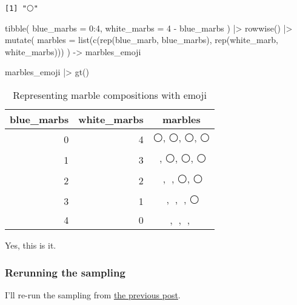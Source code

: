 \documentclass[
  letterpaper,
  DIV=11,
  numbers=noendperiod]{scrartcl}
\newenvironment{Shaded}{\begin{snugshade}}{\end{snugshade}}
\newcommand{\AttributeTok}[1]{\textcolor[rgb]{0.40,0.45,0.13}{#1}}
\newcommand{\DecValTok}[1]{\textcolor[rgb]{0.68,0.00,0.00}{#1}}
\newcommand{\FunctionTok}[1]{\textcolor[rgb]{0.28,0.35,0.67}{#1}}
\newcommand{\NormalTok}[1]{\textcolor[rgb]{0.00,0.23,0.31}{#1}}
\newcommand{\OtherTok}[1]{\textcolor[rgb]{0.00,0.23,0.31}{#1}}
\newcommand{\SpecialCharTok}[1]{\textcolor[rgb]{0.37,0.37,0.37}{#1}}
\begin{document}
\begin{verbatim}
[1] "⚪"
\end{verbatim}

\begin{Shaded}
\begin{Highlighting}[]
\FunctionTok{tibble}\NormalTok{(}
  \AttributeTok{blue\_marbs =} \DecValTok{0}\SpecialCharTok{:}\DecValTok{4}\NormalTok{,}
  \AttributeTok{white\_marbs =} \DecValTok{4} \SpecialCharTok{{-}}\NormalTok{ blue\_marbs}
\NormalTok{) }\SpecialCharTok{|\textgreater{}} 
  \FunctionTok{rowwise}\NormalTok{() }\SpecialCharTok{|\textgreater{}} 
  \FunctionTok{mutate}\NormalTok{(}
    \AttributeTok{marbles =} \FunctionTok{list}\NormalTok{(}\FunctionTok{c}\NormalTok{(}\FunctionTok{rep}\NormalTok{(blue\_marb, blue\_marbs), }
                     \FunctionTok{rep}\NormalTok{(white\_marb, white\_marbs)))}
\NormalTok{  ) }\OtherTok{{-}\textgreater{}} 
\NormalTok{  marbles\_emoji}
\end{Highlighting}
\end{Shaded}

\begin{Shaded}
\begin{Highlighting}[]
\NormalTok{marbles\_emoji }\SpecialCharTok{|\textgreater{}} 
  \FunctionTok{gt}\NormalTok{()}
\end{Highlighting}
\end{Shaded}

\hypertarget{tbl-marbles-emoji}{}
\begin{longtable}{rrc}
\caption{\label{tbl-marbles-emoji}Representing marble compositions with emoji }\tabularnewline

\toprule
blue\_marbs & white\_marbs & marbles \\ 
\midrule
0 & 4 & ⚪, ⚪, ⚪, ⚪ \\ 
1 & 3 & 🔵, ⚪, ⚪, ⚪ \\ 
2 & 2 & 🔵, 🔵, ⚪, ⚪ \\ 
3 & 1 & 🔵, 🔵, 🔵, ⚪ \\ 
4 & 0 & 🔵, 🔵, 🔵, 🔵 \\ 
\bottomrule
\end{longtable}

Yes, this is it.

\hypertarget{rerunning-the-sampling}{%
\subsubsection{Rerunning the sampling}\label{rerunning-the-sampling}}

I'll re-run the sampling from
\href{../2023-05-09_02-small-large-worlds/index.qmd}{the previous post}.
\end{document}
